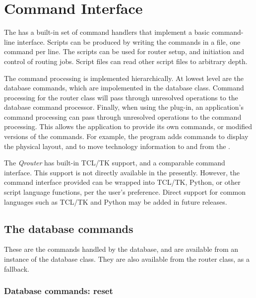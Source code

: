 
\chapter{Command Interface}

The {\MRouter} has a built-in set of command handlers that implement a
basic command-line interface.  Scripts can be produced by writing the
commands in a file, one command per line.  The scripts can be used for
router setup, and initiation and control of routing jobs.  Script files
can read other script files to arbitrary depth.

The command processing is implemented hierarchically.  At lowest level
are the database commands, which are impolemented in the database class.
Command processing for the router class will pass through unresolved
operations to the database command processor.  Finally, when using
the {\MRouter} plug-in, an application's command processing can
pass through unresolved operations to the {\MRouter} command processing.
This allows the application to provide its own commands, or modified
versions of the {\MRouter} commands.  For example, the {\Xic} program
adds commands to display the physical layout, and to move technology
information to and from the {\MRouter}.

The {\it Qrouter} has built-in TCL/TK support, and a comparable
command interface.  This support is not directly available in the
{\MRouter} presently.  However, the command interface provided can be
wrapped into TCL/TK, Python, or other script language functions, per
the user's preference.  Direct support for common languages such as
TCL/TK and Python may be added in future releases.

\section{The database commands}

These are the commands handled by the database, and are available
from an instance of the database class.  They are also available from
the router class, as a fallback.

\subsection{Database commands: {\vt reset}}

